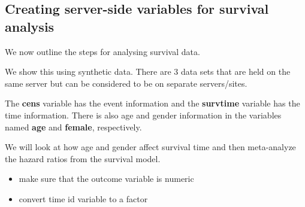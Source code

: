 \documentclass[
]{article}
\newenvironment{Shaded}{\begin{snugshade}}{\end{snugshade}}
\newcommand{\DataTypeTok}[1]{\textcolor[rgb]{0.13,0.29,0.53}{#1}}
\newcommand{\KeywordTok}[1]{\textcolor[rgb]{0.13,0.29,0.53}{\textbf{#1}}}
\newcommand{\NormalTok}[1]{#1}
\newcommand{\StringTok}[1]{\textcolor[rgb]{0.31,0.60,0.02}{#1}}
\providecommand{\tightlist}{%
  \setlength{\itemsep}{0pt}\setlength{\parskip}{0pt}}
\begin{document}
\hypertarget{creating-server-side-variables-for-survival-analysis}{%
\subsection{Creating server-side variables for survival
analysis}\label{creating-server-side-variables-for-survival-analysis}}

We now outline the steps for analysing survival data.

We show this using synthetic data. There are 3 data sets that are held
on the same server but can be considered to be on separate
servers/sites.

The \textbf{cens} variable has the event information and the
\textbf{survtime} variable has the time information. There is also age
and gender information in the variables named \textbf{age} and
\textbf{female}, respectively.

We will look at how age and gender affect survival time and then
meta-analyze the hazard ratios from the survival model.

\begin{itemize}
\tightlist
\item
  make sure that the outcome variable is numeric
\end{itemize}

\begin{Shaded}
\end{Shaded}

\begin{itemize}
\tightlist
\item
  convert time id variable to a factor
\end{itemize}

\begin{Shaded}
\end{Shaded}
\end{document}
